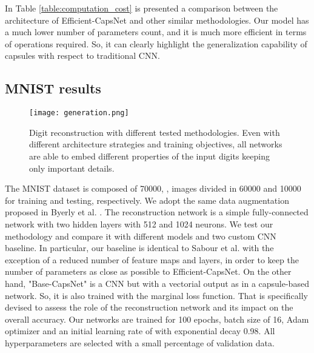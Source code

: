 \documentclass{article}
\begin{document}
In Table \ref{table:computation_cost} is presented a comparison between the architecture of Efficient-CapsNet and other similar methodologies. Our model has a much lower number of parameters count, and it is much more efficient in terms of operations required. So, it can clearly highlight the generalization capability of capsules with respect to traditional CNN.

\subsection{MNIST results}
\begin{figure}
    \centering
    \texttt{[image: generation.png]}
    \caption{Digit reconstruction with different tested methodologies. Even with different architecture strategies and training objectives, all networks are able to embed different properties of the input digits keeping only important details.}
    \label{fig:generation}
\end{figure}

The MNIST dataset \cite{lecun1998mnist} is composed of 70000, , images divided in 60000 and 10000 for training and testing, respectively. We adopt the same data augmentation proposed in Byerly et al. \cite{byerly2020branching}. The reconstruction network is a simple fully-connected network with two hidden layers with 512 and 1024 neurons. We test our methodology and compare it with different models and two custom CNN baseline. In particular, our baseline is identical to Sabour et al. \cite{sabour2017dynamic} with the exception of a reduced number of feature maps and layers, in order to keep the number of parameters as close as possible to Efficient-CapsNet. On the other hand, "Base-CapsNet" is a CNN but with a vectorial output as in a capsule-based network. So, it is also trained with the marginal loss function. That is specifically devised to assess the role of the reconstruction network and its impact on the overall accuracy. Our networks are trained for 100 epochs, batch size of 16, Adam \cite{kingma2014adam} optimizer and an initial learning rate of  with exponential decay 0.98. All hyperparameters are selected with a small percentage of validation data.
\end{document}
